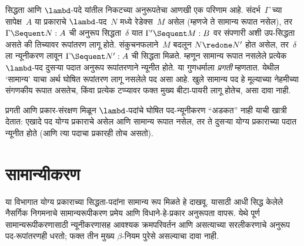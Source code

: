 सिद्धता आणि $\lambd$-पदे यांतील निकटच्या
अनुरूपतेचा आणखी एक परिणाम आहे. संदर्भ~$\Gamma$
च्या सापेक्ष~$A$ या प्रकाराचे $\lambd$-पद~$N$
मध्ये रेडेक्स~$M$ असेल (म्हणजे ते सामान्य रूपात
नसेल), तर $\Gamma \Sequent N : A$ ची अनुरूप
 सिद्धता~$\delta$ यात
$\Gamma' \Sequent M: B$ वर संपणारी अशी
उप-सिद्धता असते की तिच्यावर रूपांतरण लागू होते.
संकुचनफलाने~$M$ बदलून $N \redone N'$ होत असेल,
तर~$\delta$ ला न्यूनीकरण लावून
$\Gamma \Sequent N' : A$ ची सिद्धता मिळते.
म्हणून सामान्य रूपात नसलेले प्रत्येक $\lambd$-पद
दुसऱ्या पदात अनुरूप रूपांतरणाने न्यूनीत होते. या गुणधर्माला
\emph{प्रगती} म्हणतात.
येथील ‘सामान्य’ याचा अर्थ घोषित रूपांतरण लागू
नसलेले पद असा आहे. खुले सामान्य पद हे मूल्याच्या
नेहमीच्या संगणकीय रूपात असतेच, किंवा प्रत्येक टप्प्यावर
फक्त मुख्य बीटा-पायरी लागू होतेच, असा दावा नाही.

प्रगती आणि प्रकार-संरक्षण मिळून $\lambd$-पदांचे
घोषित पद-न्यूनीकरण ``अडकत'' नाही याची खात्री देतात:
एखादे पद योग्य प्रकाराचे असेल आणि सामान्य रूपात
नसेल, तर ते दुसऱ्या योग्य प्रकाराच्या पदात न्यूनीत
होते (आणि त्या पदाचा प्रकारही तोच असतो).














\section{सामान्यीकरण}\label{int:pty:nor:sec}

या विभागात योग्य प्रकाराच्या सिद्धता-पदांना सामान्य रूप
मिळते हे दाखवू. यासाठी आधी सिद्ध केलेले नैसर्गिक
निगमनाचे सामान्यरूपीकरण प्रमेय आणि विधाने-हे-प्रकार
अनुरूपता वापरू. येथे पूर्ण सामान्यरूपीकरणासाठी
न्यूनीकरणासह आवश्यक क्रमपरिवर्तन आणि असत्याच्या
सरलीकरणाचे अनुरूप पद-रूपांतरणही धरतो; फक्त तीन
मुख्य $\beta$-नियम पुरेसे असल्याचा दावा नाही.

